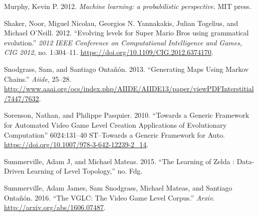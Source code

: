 \documentclass[A4paper,]{article}
\begin{document}
\hypertarget{ref-Murphy2012}{}
Murphy, Kevin P. 2012. \emph{Machine learning: a probabilistic
perspective}. MIT press.

\hypertarget{ref-Shaker2012}{}
Shaker, Noor, Miguel Nicolau, Georgios N. Yannakakis, Julian Togelius,
and Michael O'Neill. 2012. ``Evolving levels for Super Mario Bros using
grammatical evolution.'' \emph{2012 IEEE Conference on Computational
Intelligence and Games, CIG 2012}, no. 1:304--11.
\url{https://doi.org/10.1109/CIG.2012.6374170}.

\hypertarget{ref-Snodgrass2013}{}
Snodgrass, Sam, and Santiago Ontañón. 2013. ``Generating Maps Using
Markov Chains.'' \emph{Aiide}, 25--28.
\url{http://www.aaai.org/ocs/index.php/AIIDE/AIIDE13/paper/viewPDFInterstitial/7447/7632}.

\hypertarget{ref-Sorenson2010}{}
Sorenson, Nathan, and Philippe Pasquier. 2010. ``Towards a Generic
Framework for Automated Video Game Level Creation Applications of
Evolutionary Computation'' 6024:131--40 ST--Towards a Generic Framework
for Auto. \url{https://doi.org/10.1007/978-3-642-12239-2_14}.

\hypertarget{ref-Summerville2015}{}
Summerville, Adam J, and Michael Mateas. 2015. ``The Learning of Zelda :
Data-Driven Learning of Level Topology,'' no. Fdg.

\hypertarget{ref-Summerville2016}{}
Summerville, Adam James, Sam Snodgrass, Michael Mateas, and Santiago
Ontañón. 2016. ``The VGLC: The Video Game Level Corpus.'' \emph{Arxiv}.
\url{http://arxiv.org/abs/1606.07487}.
\end{document}
